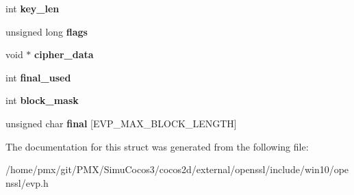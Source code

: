 \begin{DoxyCompactItemize}
\item 
\mbox{\label{structevp__cipher__ctx__st_a61064bef0c7565f3509f8d48f253637d}} 
int {\bfseries key\+\_\+len}
\item 
\mbox{\label{structevp__cipher__ctx__st_acc3a9b3a3e5a7ca498e3f5817ffc533f}} 
unsigned long {\bfseries flags}
\item 
\mbox{\label{structevp__cipher__ctx__st_a9f5ecc2a2fb070546367e44efc1d2ce8}} 
void $\ast$ {\bfseries cipher\+\_\+data}
\item 
\mbox{\label{structevp__cipher__ctx__st_a3cc687900b93b8cc130b52b0d5d9a836}} 
int {\bfseries final\+\_\+used}
\item 
\mbox{\label{structevp__cipher__ctx__st_aaa51b6dbde049f6b51227aab31a9c21d}} 
int {\bfseries block\+\_\+mask}
\item 
\mbox{\label{structevp__cipher__ctx__st_afe49879d0b4707382a3477ebb4eda55b}} 
unsigned char {\bfseries final} \mbox{[}E\+V\+P\+\_\+\+M\+A\+X\+\_\+\+B\+L\+O\+C\+K\+\_\+\+L\+E\+N\+G\+TH\mbox{]}
\end{DoxyCompactItemize}


The documentation for this struct was generated from the following file\+:\begin{DoxyCompactItemize}
\item 
/home/pmx/git/\+P\+M\+X/\+Simu\+Cocos3/cocos2d/external/openssl/include/win10/openssl/evp.\+h\end{DoxyCompactItemize}
